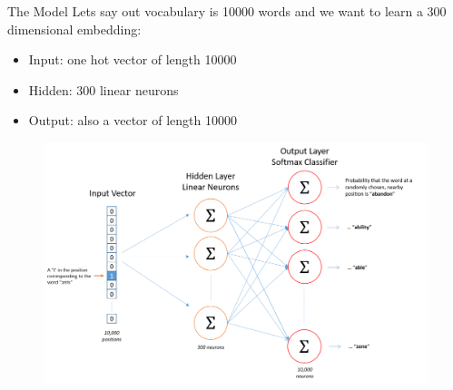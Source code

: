 \documentclass{beamer}
\begin{document}
	\begin{frame}[allowframebreaks]{The Model}
		Lets say out vocabulary is 10000 words and we want to learn a 300 dimensional embedding:
		\begin{itemize}
			\item Input: one hot vector of length 10000
			\item Hidden: 300 linear neurons
			\item Output: also a vector of length 10000
		\end{itemize}
		
		\pagebreak
%		
		\begin{figure}
			\centering
			\includegraphics[scale=0.4]{presentation_5_figures/skip_gram_net_arch}
		\end{figure}
		
	\end{frame}
		
\end{document}
